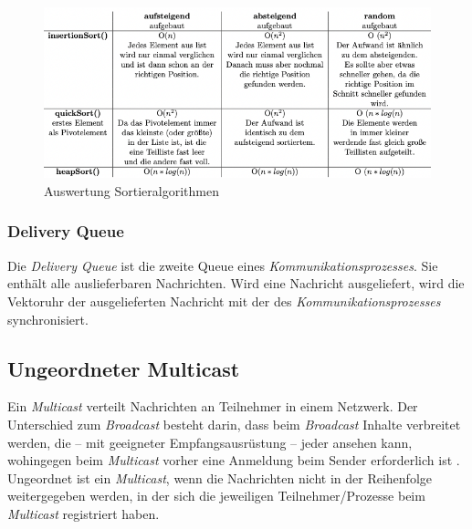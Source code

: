 \begin{figure}[htbp]
\begin{center}
\includegraphics[scale=0.59]{Latex/Bilder/sortAlgo.png}
\caption{\label{fig:sortAlgo} Auswertung Sortieralgorithmen \cite{sortAlgo}} 
\end{center}
\end{figure}

\subsubsection{Delivery Queue}

Die \textit{Delivery Queue} ist die zweite Queue eines \textit{Kommunikationsprozesses}. Sie enthält alle auslieferbaren Nachrichten.
Wird eine Nachricht ausgeliefert, wird die Vektoruhr der ausgelieferten Nachricht mit der des \textit{Kommunikationsprozesses} synchronisiert.

\subsection{Ungeordneter Multicast}

Ein \textit{Multicast} verteilt Nachrichten an Teilnehmer in einem Netzwerk. Der Unterschied zum \textit{Broadcast} besteht darin, dass beim \textit{Broadcast} Inhalte verbreitet werden, die – mit geeigneter Empfangsausrüstung – jeder ansehen kann, wohingegen beim \textit{Multicast} vorher eine Anmeldung beim Sender erforderlich ist \cite{wiki:Multicast}.\\
Ungeordnet ist ein \textit{Multicast}, wenn die Nachrichten nicht in der Reihenfolge weitergegeben werden, in der sich die jeweiligen Teilnehmer/Prozesse beim \textit{Multicast} registriert haben.

